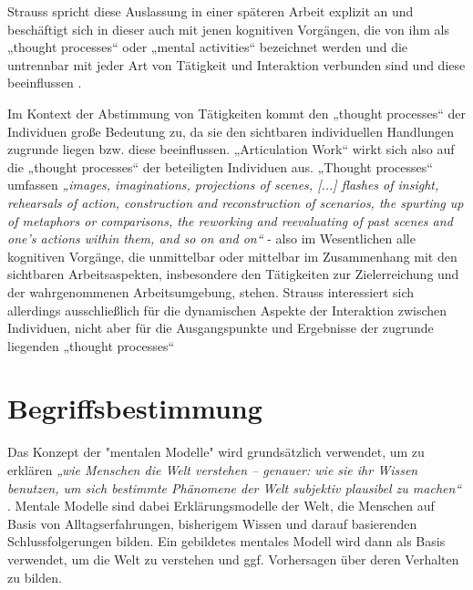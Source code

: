 Strauss spricht diese Auslassung in einer späteren Arbeit explizit an \citep[][S. 131]{Strauss93} und beschäftigt sich in dieser auch mit jenen kognitiven Vorgängen, die von ihm als „thought processes“ oder „mental activities“ bezeichnet werden und die untrennbar mit jeder Art von Tätigkeit und Interaktion verbunden sind \citep[][S. 146]{Strauss93} und diese beeinflussen \citep[][S. 132]{Strauss93}.  

Im Kontext der Abstimmung von Tätigkeiten kommt den „thought processes“ der Individuen große Bedeutung zu, da sie den sichtbaren individuellen Handlungen zugrunde liegen bzw. diese beeinflussen. „Articulation Work“ wirkt sich also auf die „thought processes“ der beteiligten Individuen aus. „Thought processes“ umfassen \emph{„images, imaginations, projections of scenes, [...] flashes of insight, rehearsals of action, construction and reconstruction of scenarios,  the spurting up of metaphors or comparisons, the reworking and reevaluating of past scenes and one's actions within them, and so on and on“} \citep[][S. 130]{Strauss93} - also im Wesentlichen alle kognitiven Vorgänge, die unmittelbar oder mittelbar im Zusammenhang mit den sichtbaren Arbeitsaspekten, insbesondere den Tätigkeiten zur Zielerreichung und der wahrgenommenen Arbeitsumgebung, stehen. Strauss interessiert sich allerdings ausschließlich für die dynamischen Aspekte der Interaktion zwischen Individuen, nicht aber für die Ausgangspunkte und Ergebnisse der zugrunde liegenden „thought processes“ \citep[][S. 149]{Strauss93}


\section{Begriffsbestimmung} %
\label{sec:begriffsbestimmung}


Das Konzept der "mentalen Modelle" wird grundsätzlich verwendet, um zu erklären \emph{„wie Menschen die Welt verstehen -- genauer: wie sie ihr Wissen benutzen, um sich bestimmte Phänomene der Welt subjektiv plausibel zu machen“} \citep[][S. VII]{Seel91}. Mentale Modelle sind dabei Erklärungsmodelle der Welt, die Menschen auf Basis von Alltagserfahrungen, bisherigem Wissen und darauf basierenden Schlussfolgerungen bilden. Ein gebildetes mentales Modell wird dann als Basis verwendet, um die Welt zu verstehen und ggf. Vorhersagen über deren Verhalten zu bilden. \citep[][S. VII]{Seel91}

